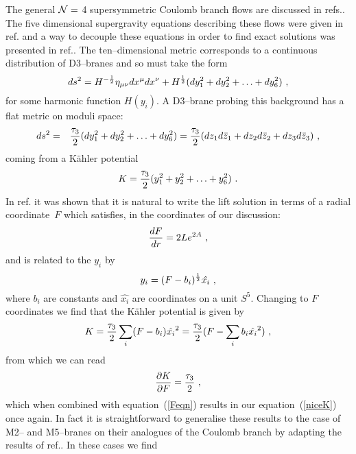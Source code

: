\documentclass[a4paper,12pt]{article}
\newcommand{\labell}[1]{\label{#1}}
\begin{document}
The general $\cal{N} =$ 4 supersymmetric Coulomb branch flows are
discussed in refs.\cite{freed2,bakas}. The five dimensional
supergravity equations describing these flows were given in
ref.\cite{freed2} and a way to decouple these equations in order to
find exact solutions was presented in ref.\cite{bakas}.  The
ten--dimensional metric corresponds to a continuous distribution of
D3--branes\cite{kraus} and so must take the form
\begin{equation}
  ds^2 = H^{-{1 \over 2}} 
\eta_{\mu \nu} dx^\mu dx^\nu + H^{1 \over 2} (dy_1 ^2 + dy_2 ^2 + \ldots + 
dy_6 ^2)\ ,
\end{equation}
for some harmonic function $H(y_i)$. A D3--brane probing this
background has a flat metric on moduli space\cite{primer}:
\begin{eqnarray}
ds^2 &=& {\tau_3 \over 2} (dy_1 ^2 + dy_2 ^2 + \ldots + dy_6 ^2) 
  = {\tau_3 \over 2} (dz_1 d\bar{z}_1 + dz_2 d\bar{z}_2 + dz_3 d\bar{z}_3)\ ,
\end{eqnarray}
coming from a K\"ahler potential
\begin{equation}
  K = {\tau_3 \over 2} (y_1 ^2 + y_2 ^2 + \ldots + y_6 ^2)\ .
\end{equation}
In ref.\cite{bakas} it was shown that it is natural to write the lift
solution in terms of a radial coordinate~$F$ which satisfies, in the 
coordinates of our discussion:
\begin{equation}
  {dF \over dr} = 2L e^{2A}\ ,
  \labell{Feqn}
\end{equation}
and is related to the $y_i$ by
\begin{equation}
  y_i = (F - b_i)^{1 \over 2} \hat{x_i}\ ,
\end{equation}
where $b_i$ are constants and $\hat{x_i}$ are coordinates on a unit
$S^5$. Changing to $F$ coordinates we find that the K\"ahler potential
is given by
\begin{equation}
K = {\tau_3 \over 2} \sum_i (F-b_i) \hat{x_i}^2 = {\tau_3 \over 2}(F - \sum_i b_i \hat{x_i}^2)\ ,
\end{equation}
from which we can read 
\begin{equation}
  {\partial K \over \partial F} = {\tau_3 \over 2} \ , 
\end{equation}
which when combined with equation~(\ref{Feqn}) results in our
equation~(\ref{niceK}) once again.  In fact it is straightforward to
generalise these results to the case of M2-- and M5--branes on their
analogues of the Coulomb branch by adapting the results of
ref.\cite{bakas2}.  In these cases we find
\end{document}
